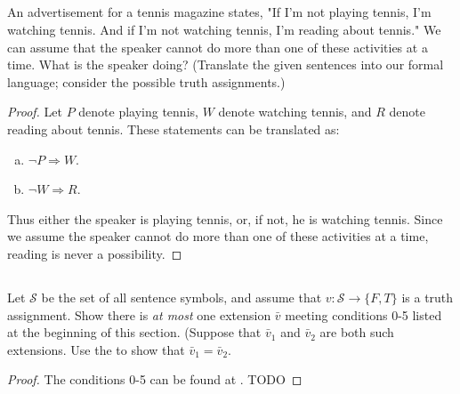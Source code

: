 \documentclass{report}
\begin{document}
\subsection{}%

  An advertisement for a tennis magazine states, "If I'm not playing tennis,
    I'm watching tennis. And if I'm not watching tennis, I'm reading about
    tennis."
  We can assume that the speaker cannot do more than one of these activities at
    a time.
  What is the speaker doing?
  (Translate the given sentences into our formal language; consider the possible
    truth assignments.)

  \begin{proof}
    Let $P$ denote playing tennis, $W$ denote watching tennis, and $R$ denote
      reading about tennis.
    These statements can be translated as:
      \begin{enumerate}[(a)]
        \item $\neg P \Rightarrow W$.
        \item $\neg W \Rightarrow R$.
      \end{enumerate}
    Thus either the speaker is playing tennis, or, if not, he is watching
      tennis.
    Since we assume the speaker cannot do more than one of these activities at
      a time, reading is never a possibility.
  \end{proof}

\subsection{}%

  Let $\mathcal{S}$ be the set of all sentence symbols, and assume that
    $v \colon \mathcal{S} \rightarrow \{F, T\}$ is a truth assignment.
  Show there is \textit{at most} one extension $\bar{v}$ meeting conditions 0-5
    listed at the beginning of this section.
  (Suppose that $\bar{v}_1$ and $\bar{v}_2$ are both such extensions. Use the
     to show that $\bar{v}_1 = \bar{v}_2$.

  \begin{proof}
    The conditions 0-5 can be found at .
    TODO
  \end{proof}

\subsection{}%
\end{document}
